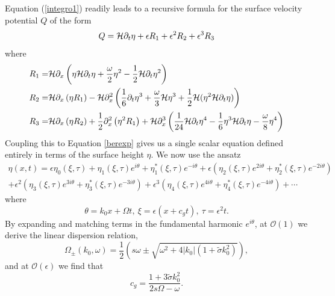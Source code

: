 \documentclass{JFM_Style/jfm}
\begin{document}
Equation (\ref{integro1}) readily leads to a recursive formula for the surface velocity potential $Q$ of the form 
\begin{equation}
Q = \mathcal{H}\partial_{t}\eta + \epsilon R_{1} + \epsilon^{2} R_{2} + \epsilon^{3} R_{3}
\label{Qexp}
\end{equation}
where
\begin{align*}
R_{1}= & \mathcal{H}\partial_{x}\left(\eta\mathcal{H}\partial_{t}\eta+ \frac{\omega}{2}\eta^{2} - \frac{1}{2}\mathcal{H}\partial_{t}\eta^{2} \right)\\
R_{2}= & \mathcal{H}\partial_{x}\left(\eta R_{1} \right) - \mathcal{H}\partial_{x}^{2}\left(\frac{1}{6}\partial_{t}\eta^{3} + \frac{\omega}{3}\mathcal{H}\eta^{3} + \frac{1}{2}\mathcal{H}(\eta^{2}\mathcal{H}\partial_{t}\eta)\right)\\
R_{3} = & \mathcal{H}\partial_{x}\left(\eta R_{2} \right) + \frac{1}{2}\partial_{x}^{2}\left(\eta^{2}R_{1}\right) + \mathcal{H}\partial_{x}^{3}\left(\frac{1}{24}\mathcal{H}\partial_{t}\eta^{4} - \frac{1}{6}\eta^{3}\mathcal{H}\partial_{t}\eta - \frac{\omega}{8}\eta^{4}\right)  
\end{align*}
Coupling this to Equation \eqref{berexp} gives us a single scalar equation defined entirely in terms of the surface height $\eta$.  We now use the ansatz
\begin{multline}
\eta(x,t) = \epsilon \eta_{0}(\xi,\tau) + \eta_{1}(\xi,\tau)e^{i\theta} +  \eta_{1}^{\ast}(\xi,\tau)e^{-i\theta} + \epsilon\left(\eta_{2}(\xi,\tau)e^{2i\theta} +  \eta_{2}^{\ast}(\xi,\tau)e^{-2i\theta}\right) \\
+ \epsilon^{2}\left(\eta_{3}(\xi,\tau)e^{3i\theta} +  \eta_{3}^{\ast}(\xi,\tau)e^{-3i\theta}\right)  + \epsilon^{3}\left(\eta_{4}(\xi,\tau)e^{4i\theta} +  \eta_{4}^{\ast}(\xi,\tau)e^{-4i\theta}\right) + \cdots
\label{nlssurfexp}
\end{multline}
where
\[
\theta = k_{0}x + \Omega t, ~ \xi = \epsilon(x + c_{g}t), ~ \tau = \epsilon^{2}t.
\]
By expanding and matching terms in the fundamental harmonic $e^{i\theta}$, at $\mathcal{O}(1)$ we derive the linear dispersion relation,
\begin{equation}
\Omega_{\pm}(k_{0},\omega)  = \frac{1}{2}\left(s\omega \pm \sqrt{\omega^{2} + 4|k_{0}|(1+\tilde{\sigma}k_{0}^{2})}\right),
\label{LDR}
\end{equation}
and at $\mathcal{O}(\epsilon)$ we find that 
\[
c_{g} = \frac{1+3\tilde{\sigma}k_{0}^{2}}{2s\Omega - \omega}.
\]
\end{document}
